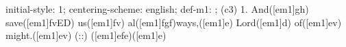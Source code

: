 initial-style: 1;
centering-scheme: english;
def-m1: \grealign;
(c3) 1. And([em1]gh) save([em1]fvED) us([em1]fv) al([em1]fgf)ways,([em1]e) Lord([em1]d) of([em1]ev) might.([em1]ev) (::) ([em1]efe)([em1]e)